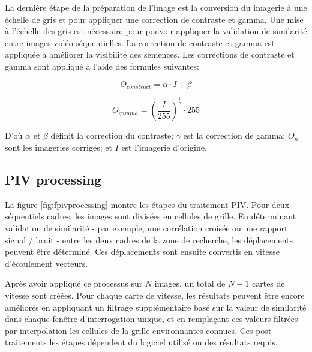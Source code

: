 \documentclass[
]{article}
\begin{document}
La dernière étape de la préparation de l'image est la conversion du
imagerie à une échelle de gris et pour appliquer une correction de contraste et gamma.
Une mise à l'échelle des gris est nécessaire pour pouvoir appliquer la validation de similarité entre
images vidéo séquentielles. La correction de contraste et gamma est appliquée à
améliorer la visibilité des semences. Les corrections de contraste et gamma sont
appliqué à l'aide des formules suivantes:

\begin{equation}
O_{constract} = \alpha \cdot I + \beta
\label{eq:constract}
\end{equation}

\begin{equation}
O_{gamma} = \left(\frac{I}{255}\right)^\frac{1}{\gamma} \cdot 255
\label{eq:gamma}
\end{equation}

D'où \(\alpha\) et \(\beta\) définit la correction du contraste; \(\gamma\) est la correction de gamma; \(O_n\) sont les imageries corrigés; et \(I\) est l'imagerie d'origine.

\hypertarget{pp}{%
\subsection{PIV processing}\label{pp}}

La figure \ref{fig:fpivprocessing} montre les étapes du traitement PIV. Pour deux séquentiels
cadres, les images sont divisées en cellules de grille. En déterminant
validation de similarité - par exemple, une corrélation croisée ou une
rapport signal / bruit \citetext{\citealp[ ]{ran_application_2016}; \citealp{osorio-cano_method_2013}} -
entre les deux cadres de la zone de recherche, les déplacements peuvent être
déterminé. Ces déplacements sont ensuite convertis en vitesse d'écoulement
vecteurs.

Après avoir appliqué ce processus sur \(𝑁\) images, un total de \(𝑁− 1\) cartes de vitesse
sont créées. Pour chaque carte de vitesse, les résultats peuvent être encore améliorés
en appliquant un filtrage supplémentaire basé sur la valeur de similarité dans chaque
fenêtre d'interrogation unique, et en remplaçant ces valeurs filtrées par
interpolation les cellules de la grille environnantes connues. Ces post-traitements
les étapes dépendent du logiciel utilisé ou des résultats requis.
\end{document}
